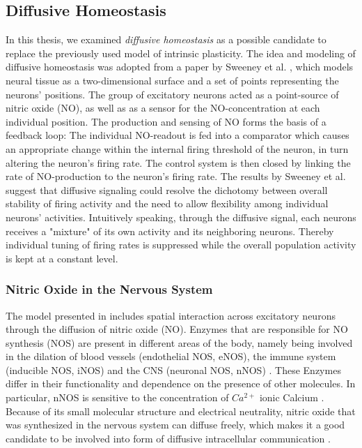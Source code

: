\documentclass[10pt,a4paper]{article}
\begin{document}
\subsection{Diffusive Homeostasis}\label{DIff_Hom_Intro_Section}
In this thesis, we examined \textit{diffusive homeostasis} as a possible candidate to replace the previously used model of intrinsic plasticity. The idea and modeling of diffusive homeostasis was adopted from a paper by Sweeney et al. \cite{Sweeney_Paper}, which models neural tissue as a two-dimensional surface and a set of points representing the neurons' positions. The group of excitatory neurons acted as a point-source of nitric oxide (NO), as well as as a sensor for the NO-concentration at each individual position. The production and sensing of NO forms the basis of a feedback loop: The individual NO-readout is fed into a comparator which causes an appropriate change within the internal firing threshold of the neuron, in turn altering the neuron's firing rate. The control system is then closed by linking the rate of NO-production to the neuron's firing rate. The results by Sweeney et al. suggest that diffusive signaling could resolve the dichotomy between overall stability of firing activity and the need to allow flexibility among individual neurons' activities. Intuitively speaking, through the diffusive signal, each neurons receives a "mixture" of its own activity and its neighboring neurons. Thereby individual tuning of firing rates is suppressed while the overall population activity is kept at a constant level.

\subsubsection{Nitric Oxide in the Nervous System}\label{NO_Experiments_Section}
The model presented in \cite{Sweeney_Paper} includes spatial interaction across excitatory neurons through the diffusion of nitric oxide (NO). Enzymes that are responsible for NO synthesis (NOS) are present in different areas of the body, namely being involved in the dilation of blood vessels (endothelial NOS, eNOS), the immune system (inducible NOS, iNOS) and the CNS (neuronal NOS, nNOS) \cite{NOS_Mammals}. These Enzymes differ in their functionality and dependence on the presence of other molecules. In particular, nNOS is sensitive to the concentration of $Ca^{2+}$ ionic Calcium \cite{Knowles_Ca_nNOS,Steinert_NO}. Because of its small molecular structure and electrical neutrality, nitric oxide that was synthesized in the nervous system can diffuse freely, which makes it a good candidate to be involved into form of diffusive intracellular communication \cite{Lancaster_1994}. 
\end{document}
